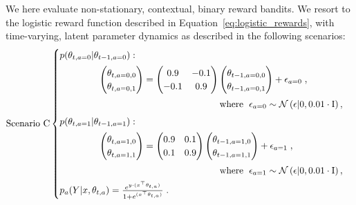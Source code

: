 We here evaluate non-stationary, contextual, binary reward bandits.
We resort to the logistic reward function described in Equation~\eqref{eq:logistic_rewards},
with time-varying, latent parameter dynamics as described in the following scenarios:
\begin{equation}
\text{Scenario C}
\begin{cases}
\vspace*{1ex}
p(\theta_{t,a=0}|\theta_{t-1,a=0}): \\ \vspace*{1ex}
\hspace*{10ex}\begin{pmatrix}
\theta_{t,a=0,0}\\
\theta_{t,a=0,1}\\
\end{pmatrix} = \begin{pmatrix}
0.9 & -0.1 \\
-0.1 & 0.9 \\
\end{pmatrix} \begin{pmatrix}
\theta_{t-1,a=0,0}\\
\theta_{t-1,a=0,1}\\
\end{pmatrix} + \epsilon_{a=0} \;, \\ \vspace*{1ex}
\hspace*{40ex} \text{where } \;  \epsilon_{a=0} \sim \N{\epsilon|0,0.01 \cdot\mathrm{I}},\\

\vspace*{1ex}
p(\theta_{t,a=1}|\theta_{t-1,a=1}): \\ \vspace*{1ex}
\hspace*{10ex}\begin{pmatrix}
\theta_{t,a=1,0}\\
\theta_{t,a=1,1}\\
\end{pmatrix} = \begin{pmatrix}
0.9 & 0.1 \\
0.1 & 0.9 \\
\end{pmatrix} \begin{pmatrix}
\theta_{t-1,a=1,0}\\
\theta_{t-1,a=1,1}\\
\end{pmatrix} + \epsilon_{a=1}  \;, \\ \vspace*{1ex}
\hspace*{40ex} \text{where } \;  \epsilon_{a=1} \sim \N{\epsilon|0,0.01 \cdot\mathrm{I}},\\

p_a(Y|x,\theta_{t,a})=\frac{e^{y\cdot(x^\top\theta_{t,a}) }}{1+e^{(x^\top\theta_{t,a})}} \; .
\end{cases}
\label{eq:linear_mixing_dynamics_c}
\end{equation}

